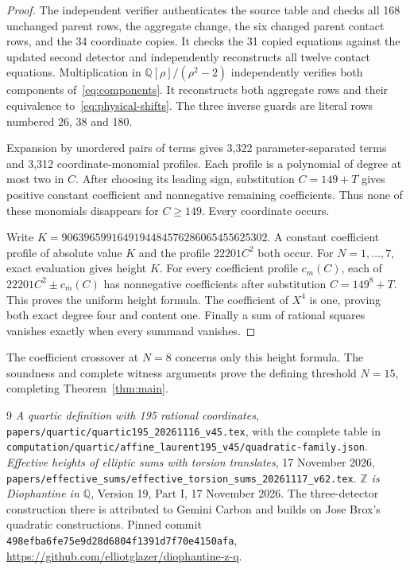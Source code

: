 \documentclass[11pt,a4paper]{article}
\newcommand{\Q}{\mathbb Q}\newcommand{\Z}{\mathbb Z}
\begin{document}
\begin{proof}
The independent verifier authenticates the source table and checks
all 168 unchanged parent rows, the aggregate change, the six
changed parent contact rows, and the 34 coordinate copies. It checks
the 31 copied equations against the updated second detector and
independently reconstructs all twelve contact equations. Multiplication in
$\Q[\rho]/(\rho^2-2)$ independently verifies both components
of~\eqref{eq:components}. It reconstructs both aggregate rows and
their equivalence to~\eqref{eq:physical-shifts}. The three inverse
guards are literal rows numbered 26, 38 and 180.

Expansion by unordered pairs of terms gives 3,322 parameter-separated
terms and 3,312 coordinate-monomial profiles. Each profile is a
polynomial of degree at most two in $C$. After choosing its leading
sign, substitution $C=149+T$ gives positive constant coefficient and
nonnegative remaining coefficients. Thus none of these monomials
disappears for $C\ge149$. Every coordinate occurs.

Write $K=9063965991649194484576286065455625302$. A constant coefficient
profile of absolute value $K$ and the profile $22201C^2$ both occur. For $N=1,\ldots,7$,
exact evaluation gives height $K$. For every coefficient profile
$c_m(C)$, each of $22201C^2\pm c_m(C)$ has nonnegative coefficients
after substitution $C=149^8+T$. This proves the uniform height
formula. The coefficient of $X^4$ is one, proving both exact degree
four and content one. Finally a sum of rational squares vanishes
exactly when every summand vanishes.
\end{proof}

The coefficient crossover at $N=8$ concerns only this height formula.
The soundness and complete witness arguments prove the defining
threshold $N=15$, completing Theorem~\ref{thm:main}.

\begin{thebibliography}{9}
\emph{A quartic definition with 195 rational coordinates},
\nolinkurl{papers/quartic/quartic195_20261116_v45.tex},
with the complete table in
\nolinkurl{computation/quartic/affine_laurent195_v45/quadratic-family.json}.
\emph{Effective heights of elliptic sums with torsion translates},
17 November 2026,
\nolinkurl{papers/effective_sums/effective_torsion_sums_20261117_v62.tex}.
\emph{$\Z$ is Diophantine in $\Q$}, Version 19, Part I,
17 November 2026. The three-detector construction there is attributed
to Gemini Carbon and builds on Jose Brox's quadratic constructions.
Pinned commit
\texttt{498efba6fe75e9d28d6804f1391d7f70e4150afa},
\url{https://github.com/elliotglazer/diophantine-z-q}.
\end{thebibliography}
\end{document}
